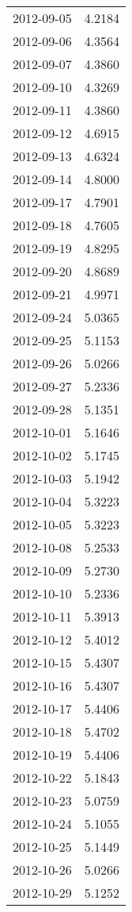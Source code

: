 \begin{tabular}{lr}
2012-09-05 &      4.2184 \\
2012-09-06 &      4.3564 \\
2012-09-07 &      4.3860 \\
2012-09-10 &      4.3269 \\
2012-09-11 &      4.3860 \\
2012-09-12 &      4.6915 \\
2012-09-13 &      4.6324 \\
2012-09-14 &      4.8000 \\
2012-09-17 &      4.7901 \\
2012-09-18 &      4.7605 \\
2012-09-19 &      4.8295 \\
2012-09-20 &      4.8689 \\
2012-09-21 &      4.9971 \\
2012-09-24 &      5.0365 \\
2012-09-25 &      5.1153 \\
2012-09-26 &      5.0266 \\
2012-09-27 &      5.2336 \\
2012-09-28 &      5.1351 \\
2012-10-01 &      5.1646 \\
2012-10-02 &      5.1745 \\
2012-10-03 &      5.1942 \\
2012-10-04 &      5.3223 \\
2012-10-05 &      5.3223 \\
2012-10-08 &      5.2533 \\
2012-10-09 &      5.2730 \\
2012-10-10 &      5.2336 \\
2012-10-11 &      5.3913 \\
2012-10-12 &      5.4012 \\
2012-10-15 &      5.4307 \\
2012-10-16 &      5.4307 \\
2012-10-17 &      5.4406 \\
2012-10-18 &      5.4702 \\
2012-10-19 &      5.4406 \\
2012-10-22 &      5.1843 \\
2012-10-23 &      5.0759 \\
2012-10-24 &      5.1055 \\
2012-10-25 &      5.1449 \\
2012-10-26 &      5.0266 \\
2012-10-29 &      5.1252 \\

\end{tabular}
